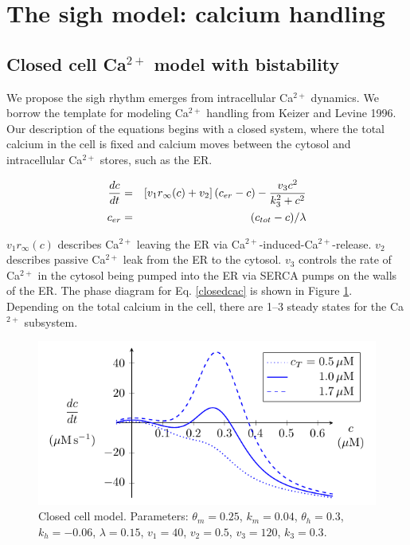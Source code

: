 \documentclass[12pt]{article}
\def\ca{Ca$^{2+}$\xspace}
\def\ctot{c_{tot}}
\def\cer{c_{er}}
\def\rinf{r_\infty}
\def\rinf{r_\infty}
\def\thetam{\theta_m}
\def\km{k_m}
\def\thetah{\theta_h}
\def\kh{k_h}
\begin{document}
\clearpage          
\section*{The sigh model: calcium handling}

\subsection*{Closed cell Ca$^{2+}$ model with bistability}

We propose the sigh rhythm emerges from intracellular Ca$^{2+}$ dynamics. We borrow the template for modeling \ca handling from Keizer and Levine 1996. Our description of the equations begins with a closed system, where the total calcium in the cell is fixed and calcium moves between the cytosol and intracellular \ca stores, such as the ER.

\begin{eqnarray}
  \ddt{c} &=&  \left[ v_1  \rinf (c)+ v_2 \right] (\cer - c ) - \frac{v_3 c^2}{k_3^2+c^2} \label{closedcac1}\\
  \cer &=& (\ctot-c)/\lambda \label{closedcac2}
\end{eqnarray}

$v_1r_\infty(c)$ describes \ca leaving the ER via \ca-induced-\ca-release. $v_2$ describes passive \ca leak from the ER to the cytosol. $v_3$ controls the rate of \ca in the cytosol being pumped into the ER via SERCA pumps on the walls of the ER. The phase diagram for Eq. \ref{closedcac} is shown in Figure \ref{CalciumClosedCell}. Depending on the total calcium in the cell, there are 1--3 steady states for the \ca subsystem.

\def\figthetam{0.25}
\def\figkm{0.04}
\def\figthetah{0.3}
\def\figkh{-0.06}
\def\figlambda{0.15}
\def\figvone{40}
\def\figvtwo{0.5}
\def\figvthree{120}
\def\figkthree{0.3}


\begin{figure}[h!]
\centering
\includegraphics[]{Fig03CalciumClosedCellModel.pdf}
\caption{Closed cell model. Parameters: 
$\thetam=\figthetam$,
$\km=\figkm$,
$\thetah=\figthetah$,
$\kh=\figkh$,
$\lambda=\figlambda$,
$v_1 = \figvone$,
$v_2 = \figvtwo$,
$v_3 = \figvthree$, 
$k_3 = \figkthree$.
}
\label{CalciumClosedCell}
\end{figure}
 
\end{document}
